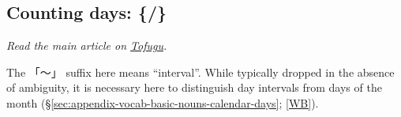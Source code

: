 \documentclass[../nihongo-gakushuu-kyouzai-supplementary.tex]{subfiles}
\begin{document}
\subsection{Counting days: \{/\}} \label{sec:appendix-vocab-basic-nouns-counting-days}
\emph{Read the main article on \href{https://www.tofugu.com/japanese/japanese-counter-ka-nichi/}{Tofugu}.}

The 「〜」 suffix here means ``interval''. While typically dropped in the absence of ambiguity, it is necessary here to distinguish day intervals from days of the month (\S\ref{sec:appendix-vocab-basic-nouns-calendar-days}; \href{https://en.wikibooks.org/wiki/Japanese/Lessons/Days\#Periods\_of\_days}{[WB]}).

\end{document}
